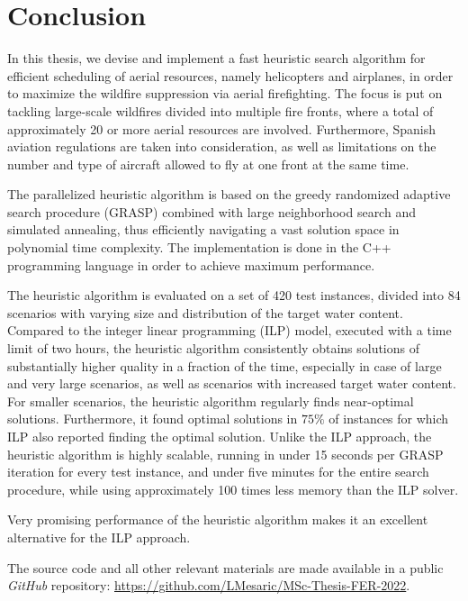 \chapter{Conclusion}

In this thesis, we devise and implement a fast heuristic search algorithm for efficient scheduling of aerial resources, namely helicopters and airplanes, in order to maximize the wildfire suppression via aerial firefighting.
The focus is put on tackling large-scale wildfires divided into multiple fire fronts, where a total of approximately 20 or more aerial resources are involved.
Furthermore, Spanish aviation regulations are taken into consideration, as well as limitations on the number and type of aircraft allowed to fly at one front at the same time.

The parallelized heuristic algorithm is based on the greedy randomized adaptive search procedure (GRASP) combined with large neighborhood search and simulated annealing, thus efficiently navigating a vast solution space in polynomial time complexity.
The implementation is done in the C++ programming language in order to achieve maximum performance.

The heuristic algorithm is evaluated on a set of 420 test instances, divided into 84 scenarios with varying size and distribution of the target water content.
Compared to the integer linear programming (ILP) model, executed with a time limit of two hours, the heuristic algorithm consistently obtains solutions of substantially higher quality in a fraction of the time, especially in case of large and very large scenarios, as well as scenarios with increased target water content.
For smaller scenarios, the heuristic algorithm regularly finds near-optimal solutions.
Furthermore, it found optimal solutions in $75\%$ of instances for which ILP also reported finding the optimal solution.
Unlike the ILP approach, the heuristic algorithm is highly scalable, running in under 15 seconds per GRASP iteration for every test instance, and under five minutes for the entire search procedure, while using approximately 100 times less memory than the ILP solver.

Very promising performance of the heuristic algorithm makes it an excellent alternative for the ILP approach.

The source code and all other relevant materials are made available in a public \textit{GitHub} repository: \small{\url{https://github.com/LMesaric/MSc-Thesis-FER-2022}}.
